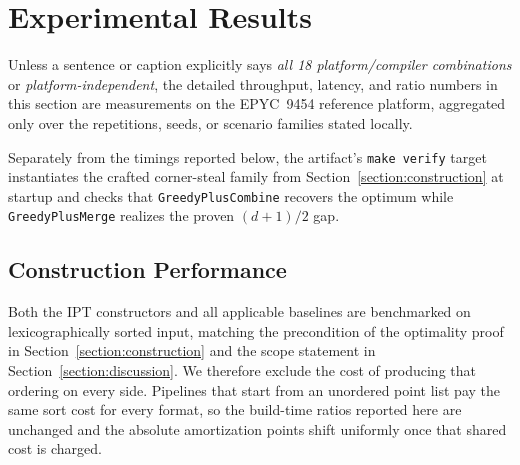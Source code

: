 \documentclass[manuscript,screen,review]{acmart}
\theoremstyle{definition}
\theoremstyle{plain}
\begin{document}
\section{Experimental Results}
\label{section:results}

Unless a sentence or caption explicitly says \emph{all 18
platform/compiler combinations} or \emph{platform-independent}, the
detailed throughput, latency, and ratio numbers in this section are
measurements on the EPYC~9454 reference platform, aggregated only over
the repetitions, seeds, or scenario families stated locally.

Separately from the timings reported below, the artifact's
\texttt{make verify} target instantiates the crafted corner-steal
family from Section~\ref{section:construction} at startup and checks
that \texttt{GreedyPlusCombine} recovers the optimum while
\texttt{GreedyPlusMerge} realizes the proven $(d+1)/2$ gap.

\subsection{Construction Performance}
\label{section:results-construct}

Both the IPT constructors and all applicable baselines are benchmarked
on lexicographically sorted input, matching the precondition of the
optimality proof in Section~\ref{section:construction} and the scope
statement in Section~\ref{section:discussion}. We therefore exclude the
cost of producing that ordering on every side. Pipelines that start
from an unordered point list pay the same sort cost for every format,
so the build-time ratios reported here are unchanged and the absolute
amortization points shift uniformly once that shared cost is charged.
\end{document}
